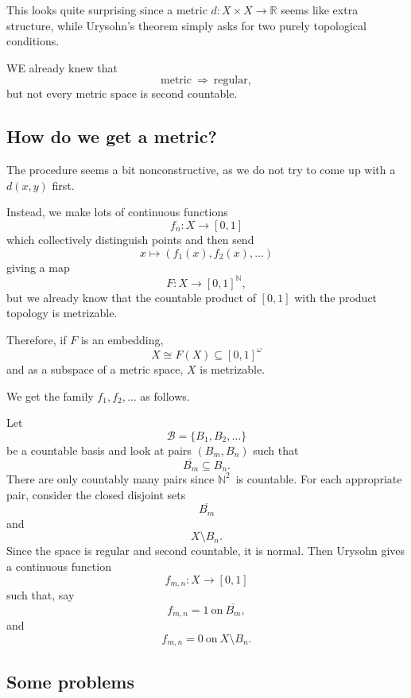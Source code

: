 \documentclass[11pt]{article}
\begin{document}
This looks quite surprising since 
a metric $d : X \times X \to \mathbb R$ 
seems like extra structure, while 
Urysohn's theorem simply asks for 
two purely topological conditions. 

WE already knew that 
\[
    \text{metric} \ \Rightarrow \ \text{regular}, 
\]
but not every metric space is 
second countable. 

\subsection{How do we get a metric?}

The procedure seems a bit nonconstructive, as we 
do not try to come up with a $d(x,y)$ 
first. 

Instead, we make lots of continuous functions 
\[
    f_n : X \to [0,1]
\]
which collectively distinguish points and then send 
\[
    x \mapsto (f_1(x), f_2(x), \ldots)
\]
giving a map 
\[
    F : X \to [0,1]^{\mathbb N}, 
\]
but we already know that the countable 
product of $[0,1]$ with the product topology 
is metrizable. 

Therefore, if $F$ is an embedding, 
\[
    X \cong F(X) \subseteq [0,1]^{\omega}
\]
and as a subspace of a metric space, $X$ is 
metrizable.

We get the family $f_1,f_2,\ldots$ as follows. 

Let 
\[
    \mathcal B = \{B_1,B_2,\ldots\}
\]
be a countable basis and look at pairs 
$(B_m,B_n)$ such that 
\[
    \overline{B_m} \subseteq B_n. 
\]
There are only countably many pairs 
since $\mathbb N^2$ is countable. 
For each appropriate pair, consider 
the closed disjoint sets 
\[
    \overline {B_m}
\]
and 
\[
    X \setminus B_n.
\]
Since the space is regular and second countable, 
it is normal. 
Then Urysohn gives a continuous function 
\[
    f_{m,n} : X \to [0,1]
\]
such that, say 
\[
    f_{m,n} = 1 \ \text{on} \ \overline{B_m},
\]
and 
\[
    f_{m,n} = 0 \ \text{on} \ X \setminus B_n. 
\]


\subsection{Some problems}
\end{document}
